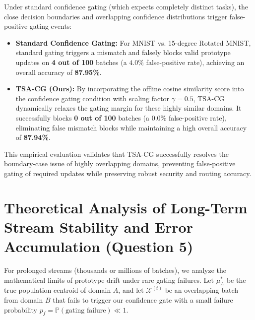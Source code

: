 \documentclass{article}
\theoremstyle{plain}
\theoremstyle{definition}
\theoremstyle{remark}
\begin{document}
Under standard confidence gating (which expects completely distinct tasks), the close decision boundaries and overlapping confidence distributions trigger false-positive gating events:
\begin{itemize}
    \item \textbf{Standard Confidence Gating:} For MNIST vs. 15-degree Rotated MNIST, standard gating triggers a mismatch and falsely blocks valid prototype updates on \textbf{4 out of 100} batches (a $4.0\%$ false-positive rate), achieving an overall accuracy of \textbf{87.95\%}.
    \item \textbf{TSA-CG (Ours):} By incorporating the offline cosine similarity score into the confidence gating condition with scaling factor $\gamma = 0.5$, TSA-CG dynamically relaxes the gating margin for these highly similar domains. It successfully blocks \textbf{0 out of 100} batches (a $0.0\%$ false-positive rate), eliminating false mismatch blocks while maintaining a high overall accuracy of \textbf{87.94\%}.
\end{itemize}
This empirical evaluation validates that TSA-CG successfully resolves the boundary-case issue of highly overlapping domains, preventing false-positive gating of required updates while preserving robust security and routing accuracy.

\section{Theoretical Analysis of Long-Term Stream Stability and Error Accumulation (Question 5)}
\label{app:stability}
For prolonged streams (thousands or millions of batches), we analyze the mathematical limits of prototype drift under rare gating failures. Let $\mu_A^*$ be the true population centroid of domain $A$, and let $\mathcal{X}^{(t)}$ be an overlapping batch from domain $B$ that fails to trigger our confidence gate with a small failure probability $p_f = \mathbb{P}(\text{gating failure}) \ll 1$.
\end{document}
